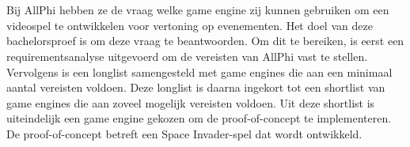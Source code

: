 
%
%
%
%
%

%




\chapter*{}

Bij AllPhi hebben ze de vraag welke game engine zij kunnen gebruiken om een videospel te ontwikkelen voor vertoning op evenementen. Het doel van deze bachelorsproef is om deze vraag te beantwoorden. Om dit te bereiken, is eerst een requirementsanalyse uitgevoerd om de vereisten van AllPhi vast te stellen. Vervolgens is een longlist samengesteld met game engines die aan een minimaal aantal vereisten voldoen. Deze longlist is daarna ingekort tot een shortlist van game engines die aan zoveel mogelijk vereisten voldoen. Uit deze shortlist is uiteindelijk een game engine gekozen om de proof-of-concept te implementeren. De proof-of-concept betreft een Space Invader-spel dat wordt ontwikkeld.
